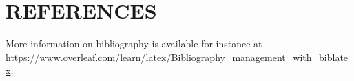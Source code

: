 \section*{REFERENCES}
\printbibliography[heading=none]

\noindent More information on bibliography is available for instance at \url{https://www.overleaf.com/learn/latex/Bibliography_management_with_biblatex}.
